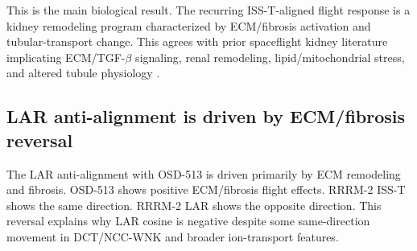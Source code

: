 \documentclass[11pt]{article}
\begin{document}
\begin{table}[h]
\centering\small
{}
\caption{Pathway drivers of OSD-513 recurrence. RRRM columns are age-pooled FLT-minus-GC pathway effects by arm. OSD-513 is FLT-minus-GC. Cosine contributions are normalized dot-product contributions.}
\label{tab:pathwaydrivers}
\end{table}

This is the main biological result. The recurring ISS-T-aligned flight response is a kidney remodeling program characterized by ECM/fibrosis activation and tubular-transport change. This agrees with prior spaceflight kidney literature implicating ECM/TGF-$\beta$ signaling, renal remodeling, lipid/mitochondrial stress, and altered tubule physiology \citep{beheshti2018microrna,daSilveira2020comprehensive,finch2025strain,siew2024cosmic}.

\subsection{LAR anti-alignment is driven by ECM/fibrosis reversal}

The LAR anti-alignment with OSD-513 is driven primarily by ECM remodeling and fibrosis. OSD-513 shows positive ECM/fibrosis flight effects. RRRM-2 ISS-T shows the same direction. RRRM-2 LAR shows the opposite direction. This reversal explains why LAR cosine is negative despite some same-direction movement in DCT/NCC-WNK and broader ion-transport features.
\end{document}
